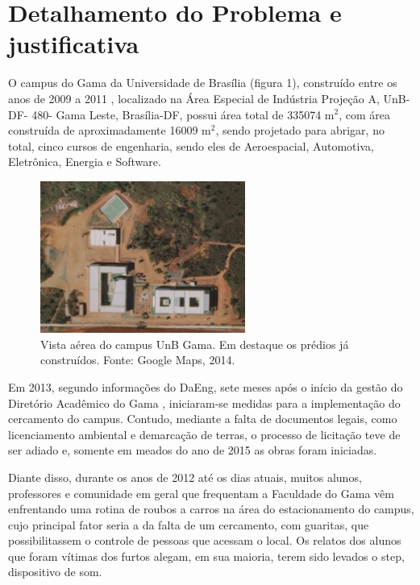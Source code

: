 \section{Detalhamento do Problema e justificativa} %
\label{sec:detalhamentoProblema}

O campus do Gama da Universidade de Brasília (figura 1), construído entre os anos de 2009 a 2011 , localizado na Área Especial de Indústria Projeção A, UnB- DF- 480- Gama Leste, Brasília-DF, possui área total de 335074 m$^2$, com área construída de aproximadamente 16009 m$^2$, sendo projetado para abrigar, no total, cinco cursos de engenharia, sendo eles de Aeroespacial, Automotiva, Eletrônica, Energia e Software.

\begin{figure}[H]
	\centering
	\includegraphics[width=0.6\textwidth]{figuras/fga1}
	\caption{Vista aérea do campus UnB Gama. Em destaque os prédios já construídos. Fonte: Google Maps, 2014.}
	\label{img:fga1}
\end{figure}


Em 2013, segundo informações do DaEng, sete meses após o início da gestão do Diretório Acadêmico do Gama , iniciaram-se medidas para a implementação do cercamento do campus. Contudo, mediante a falta de documentos legais, como licenciamento ambiental e demarcação de terras, o processo de licitação teve de ser adiado e, somente em meados do ano de 2015 as obras foram iniciadas.

Diante disso, durante os anos de 2012 até os dias atuais, muitos alunos, professores e comunidade em geral que frequentam a Faculdade do Gama vêm enfrentando uma rotina de roubos a carros na área do estacionamento do campus, cujo principal fator seria a da falta de um cercamento, com guaritas, que possibilitassem o controle de pessoas que acessam o local. Os relatos dos alunos que foram vítimas dos furtos alegam, em sua maioria, terem sido levados o step, dispositivo de som.

